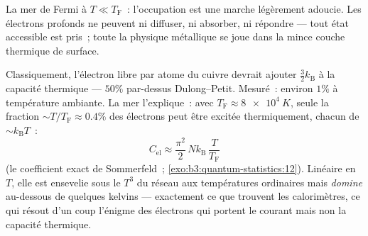 \begin{omfigure}

{\small La mer de Fermi à $T \ll T_{\text{F}}$~: l'occupation est une
marche légèrement adoucie. Les électrons profonds ne peuvent ni
diffuser, ni absorber, ni répondre --- tout état accessible est
pris~; toute la physique métallique se joue dans la mince couche
thermique de surface.}
\end{omfigure}

\begin{example}\label{ex:b3:quantum-statistics:heat}
Classiquement, l'électron libre par atome du cuivre devrait ajouter $\tfrac32
k_{\text{B}}$ à la capacité thermique --- $50\%$ par-dessus
Dulong--Petit. Mesuré~: environ $1\%$ à température ambiante. La mer
l'explique~: avec $T_{\text{F}} \approx \qty{8e4}{K}$, seule la
fraction $\sim T/T_{\text{F}} \approx 0.4\%$ des électrons peut être
excitée thermiquement, chacun de $\sim k_{\text{B}}T$~:
\[
C_{\text{el}} \approx \frac{\pi^2}{2}\,
Nk_{\text{B}}\,\frac{T}{T_{\text{F}}}
\]
(le coefficient exact de Sommerfeld~;
\cref{exo:b3:quantum-statistics:12}). Linéaire en $T$, elle est
ensevelie sous le $T^3$ du réseau aux températures ordinaires mais
\emph{domine} au-dessous de quelques kelvins --- exactement ce que
trouvent les calorimètres, ce qui résout d'un coup l'énigme des
électrons qui portent le courant mais non la capacité thermique.
\end{example}

